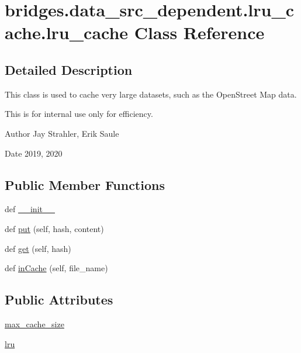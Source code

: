 \hypertarget{classbridges_1_1data__src__dependent_1_1lru__cache_1_1lru__cache}{}\section{bridges.\+data\+\_\+src\+\_\+dependent.\+lru\+\_\+cache.\+lru\+\_\+cache Class Reference}
\label{classbridges_1_1data__src__dependent_1_1lru__cache_1_1lru__cache}


\subsection{Detailed Description}
This class is used to cache very large datasets, such as the Open\+Street Map data. 

This is for internal use only for efficiency.

\begin{DoxyAuthor}{Author}
Jay Strahler, Erik Saule 
\end{DoxyAuthor}
\begin{DoxyDate}{Date}
2019, 2020 
\end{DoxyDate}
\subsection*{Public Member Functions}
\begin{DoxyCompactItemize}
\item 
def \hyperlink{classbridges_1_1data__src__dependent_1_1lru__cache_1_1lru__cache_a66d09fd9beb3e82c94960960456fc6f7}{\+\_\+\+\_\+init\+\_\+\+\_\+}
\item 
def \hyperlink{classbridges_1_1data__src__dependent_1_1lru__cache_1_1lru__cache_a98b97dd34aeaec0856bbc560cbac2866}{put} (self, hash, content)
\item 
def \hyperlink{classbridges_1_1data__src__dependent_1_1lru__cache_1_1lru__cache_a808ebb43936c26cae242752509e3e772}{get} (self, hash)
\item 
def \hyperlink{classbridges_1_1data__src__dependent_1_1lru__cache_1_1lru__cache_abfd53102b85993476f3dc75416811761}{in\+Cache} (self, file\+\_\+name)
\end{DoxyCompactItemize}
\subsection*{Public Attributes}
\begin{DoxyCompactItemize}
\item 
\hyperlink{classbridges_1_1data__src__dependent_1_1lru__cache_1_1lru__cache_a87a170ed62886de32e1bbf0d9ac05cfd}{max\+\_\+cache\+\_\+size}
\item 
\hyperlink{classbridges_1_1data__src__dependent_1_1lru__cache_1_1lru__cache_a2568c6b5de855a1ad90f876276b8cf49}{lru}
\end{DoxyCompactItemize}


